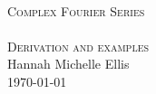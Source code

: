 \begin{titlepage}
\begin{center}
\HRule \\[0.5cm]
\textsc{\huge Complex Fourier Series}\\[0.5cm]
\HRule \\[0.5cm]
\textsc{\Large Derivation and examples}\\[0.5cm]
\vfill
Hannah Michelle Ellis\\[1.0cm]
\today
\end{center}
\end{titlepage}
